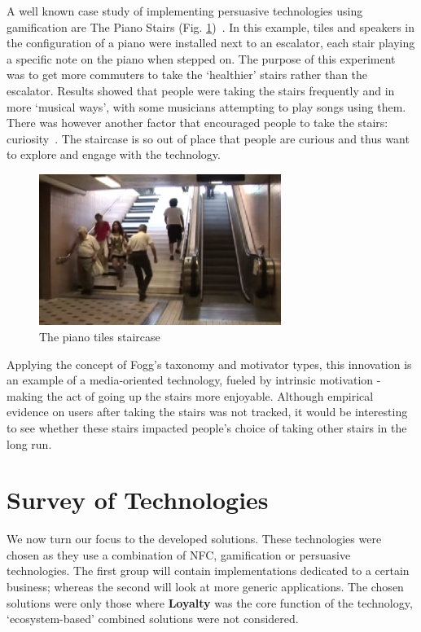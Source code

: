A well known case study of implementing persuasive technologies using gamification are The Piano Stairs (Fig. \ref{ref:pianostaircase})~\cite{tieben2011curiosity}. In this example, tiles and speakers in the configuration of a piano were installed next to an escalator, each stair playing a specific note on the piano when stepped on. The purpose of this experiment was to get more commuters to take the `healthier' stairs rather than the escalator. Results showed that people were taking the stairs frequently and in more `musical ways', with some musicians attempting to play songs using them. There was however another factor that encouraged people to take the stairs: curiosity~\cite{tieben2011curiosity}. The staircase is so out of place that people are curious and thus want to explore and engage with the technology.

\begin{figure}[H]
  \centering
    \includegraphics[width=0.7\textwidth]{img/pianotiles.png}
      \caption{The piano tiles staircase}
      \label{ref:pianostaircase}
\end{figure}

Applying the concept of Fogg's taxonomy and motivator types, this innovation is an example of a media-oriented technology, fueled by intrinsic motivation - making the act of going up the stairs more enjoyable. Although empirical evidence on users after taking the stairs was not tracked, it would be interesting to see whether these stairs impacted people's choice of taking other stairs in the long run. 

\clearpage{}
\section{Survey of Technologies}
We now turn our focus to the developed solutions. These technologies were chosen as they use a combination of NFC, gamification or persuasive technologies. The first group will contain implementations dedicated to a certain business; whereas the second will look at more generic applications. The chosen solutions were only those where \textbf{Loyalty} was the core function of the technology, `ecosystem-based' combined solutions were not considered.

